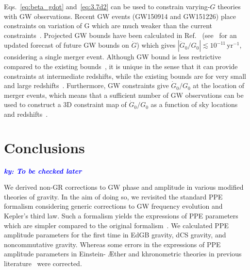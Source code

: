 \documentclass[prd,twocolumn,nofootinbib]{revtex4-1}
\newcommand{\ky}[1]{\textcolor{blue}{\it{\textbf{ky: #1}}} }
\begin{document}

Eqs.~\eqref{eq:beta_gdot} and~\eqref{eq:3.7d2} can be used to constrain varying-$G$ theories with GW observations. Recent GW events (GW150914 and GW151226) place constraints on variation of G which are much weaker than the current constraints~\cite{Yunes:2016jcc}. 
Projected GW bounds have been calculated in Ref.~\cite{Yunes:2009bv} (see~\cite{Chamberlain:2017fjl} for an updated forecast of future GW bounds on $\dot G$) which gives $|\dot{G}_0/G_0| \lesssim 10^{-11}\, \mathrm{yr}^{-1}$, considering a single merger event. Although GW bound is less restrictive compared to the existing bounds~\cite{Will2006}, it is unique in the sense that it can provide constraints at intermediate redshifts, while the existing bounds are for very small and large redshifts~\cite{Yunes:2009bv}. Furthermore, GW constraints give $\dot{G}_0/G_0$ at the location of merger events, which means that a sufficient number of GW observations can be used to construct a 3D constraint map of $\dot{G}_0/G_0$ as a function of sky locations and redshifts~\cite{Yunes:2009bv}. %
 



\section{Conclusions}

\ky{To be checked later}

We derived non-GR corrections to GW phase and amplitude in various modified theories of gravity. In the aim of doing so, we revisited the standard PPE formalism considering generic corrections to GW frequency evolution and Kepler's third law. Such a formalism yields the expressions of PPE parameters which are simpler compared to the original formalism~\cite{Yunes:2016jcc}. %
We calculated PPE amplitude parameters for the first time in EdGB gravity, dCS gravity, and noncommutative gravity. Whereas some errors in the expressions of PPE amplitude parameters in Einstein- \AE ther and khronometric theories in previous literature~\cite{Hansen:2014ewa} were corrected.
\end{document}
